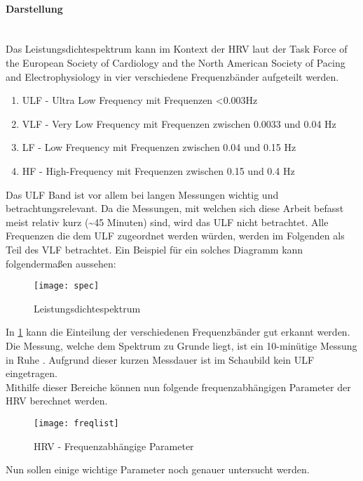  \paragraph{Darstellung}\mbox{} \\
 Das Leistungsdichtespektrum kann im Kontext der HRV laut der Task Force of the European Society of Cardiology and the North American Society of Pacing and Electrophysiology \cite{deffreq} in vier verschiedene Frequenzbänder aufgeteilt werden.\cite[S.5]{med}
 
 \begin{enumerate}
 	\item ULF - Ultra Low Frequency mit Frequenzen <0.003Hz
 	\item VLF - Very Low Frequency mit Frequenzen zwischen 0.0033 und 0.04 Hz
 	\item LF - Low Frequency mit Frequenzen zwischen 0.04 und 0.15 Hz
 	\item HF - High-Frequency mit Frequenzen zwischen 0.15 und 0.4 Hz
 \end{enumerate}
 
 Das ULF Band ist vor allem bei langen Messungen wichtig und betrachtungsrelevant. Da die Messungen, mit welchen sich diese Arbeit befasst meist relativ kurz (\textasciitilde 45 Minuten) sind, wird das ULF nicht betrachtet. Alle Frequenzen die dem ULF zugeordnet werden würden, werden im Folgenden als Teil des VLF betrachtet. Ein Beispiel für ein solches Diagramm kann folgendermaßen aussehen:
 
 \begin{figure}[H]
 	\centering
 	\texttt{[image: spec]}
 	\caption{Leistungsdichtespektrum}
 	\label{fig:spec}
 	\cite{freque}
 \end{figure}

 
 In \ref{fig:spec} kann die Einteilung der verschiedenen Frequenzbänder gut erkannt werden. Die Messung, welche dem Spektrum zu Grunde liegt, ist ein 10-minütige Messung in Ruhe \cite{freque}. Aufgrund dieser kurzen Messdauer ist im Schaubild kein ULF eingetragen. \\
 
 Mithilfe dieser Bereiche können nun folgende frequenzabhängigen Parameter der HRV berechnet werden. 
 \begin{figure}[H]
 	\centering
 	\texttt{[image: freqlist]}
 	\caption{HRV - Frequenzabhängige Parameter}
 	\label{fig:freqpic}
 	\cite[S.2]{med}
 \end{figure}
 Nun sollen einige wichtige Parameter noch genauer untersucht werden.
 

